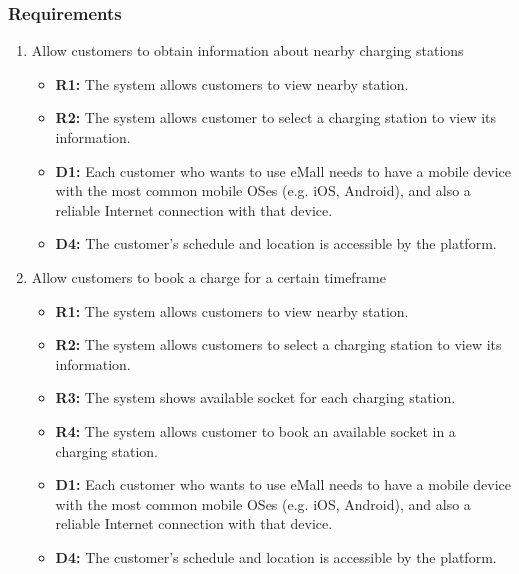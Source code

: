 \subsubsection{Requirements}
\begin{enumerate}[label=\textbf{-G\arabic*}:]
    \item {Allow customers to obtain information about nearby charging stations
          \begin{itemize}
              \item \textbf{R1:} The system allows customers to view nearby station.
              \item \textbf{R2:} The system allows customer to select a charging station to view its information.
              \item \textbf{D1:} Each customer who wants to use eMall needs to have a mobile device with the most common mobile OSes (e.g. iOS, Android), and also a reliable Internet connection with that device.
              \item \textbf{D4:} The customer's schedule and location is accessible by the platform.
          \end{itemize}
          }
    \item {Allow customers to book a charge for a certain timeframe
          \begin{itemize}
              \item \textbf{R1:} The system allows customers to view nearby station.  
              \item\textbf{R2:} The system allows customers to select a charging station to view its information.
              \item \textbf{R3:} The system shows available socket for each charging station.
              \item \textbf{R4:} The system allows customer to book an available socket in a charging station.
              \item \textbf{D1:} Each customer who wants to use eMall needs to have a mobile device with the most common mobile OSes (e.g. iOS, Android), and also a reliable Internet connection with that device.
              \item \textbf{D4:} The customer's schedule and location is accessible by the platform.
                            

\end{itemize}}
\end{enumerate}
